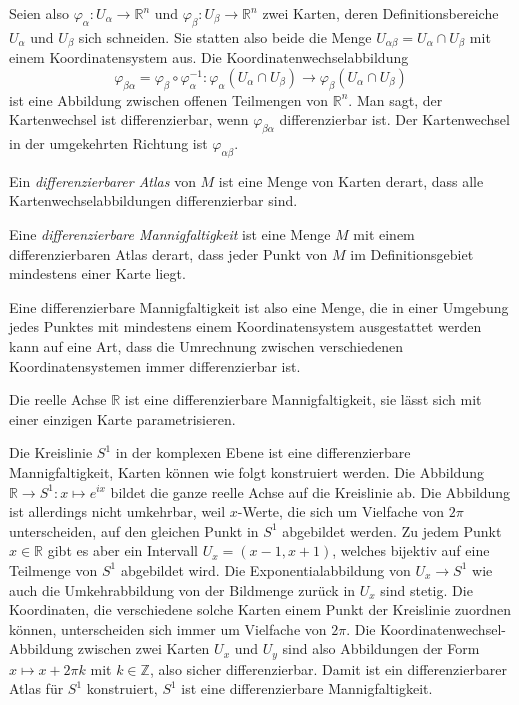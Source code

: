 Seien also
$\varphi_\alpha\colon U_\alpha \to \mathbb{R}^n$
und
$\varphi_\beta\colon U_\beta \to \mathbb{R}^n$
zwei Karten, deren Definitionsbereiche $U_\alpha$ und $U_\beta$ sich
schneiden.
Sie statten also beide die Menge $U_{\alpha\beta}=U_\alpha\cap U_\beta$
mit einem Koordinatensystem aus.
Die Koordinatenwechselabbildung
\[
\varphi_{\beta\alpha}
=
\varphi_\beta
\circ
\varphi_\alpha^{-1}
\colon
\varphi_\alpha(U_\alpha\cap U_\beta)
\to
\varphi_\beta(U_\alpha\cap U_\beta)
\]
ist eine Abbildung zwischen offenen Teilmengen von $\mathbb{R}^n$.
Man sagt, der Kartenwechsel ist differenzierbar, wenn $\varphi_{\beta\alpha}$
differenzierbar ist.
Der Kartenwechsel in der umgekehrten Richtung ist $\varphi_{\alpha\beta}$.

\begin{definition}
\label{buch:gruppen:gruppe:def:atlas}
Ein {\em differenzierbarer Atlas} von $M$ ist eine Menge von Karten derart,
dass alle Kartenwechselabbildungen differenzierbar sind.
\end{definition}

\begin{definition}
\label{buch:gruppen:gruppe:def:diffman}
Eine {\em differenzierbare Mannigfaltigkeit} ist eine Menge $M$ mit einem
differenzierbaren Atlas derart, dass jeder Punkt von $M$ im
Definitionsgebiet mindestens einer Karte liegt.
\end{definition}

Eine differenzierbare Mannigfaltigkeit ist also eine Menge, die in
einer Umgebung jedes Punktes mit mindestens einem Koordinatensystem
ausgestattet werden kann auf eine Art, dass die Umrechnung zwischen
verschiedenen Koordinatensystemen immer differenzierbar ist.

\begin{beispiel}
Die reelle Achse $\mathbb{R}$ ist eine differenzierbare Mannigfaltigkeit,
sie lässt sich mit einer einzigen Karte parametrisieren.
\end{beispiel}

\begin{beispiel}
Die Kreislinie $S^1$ in der komplexen Ebene ist eine differenzierbare
Mannigfaltigkeit, Karten können wie folgt konstruiert werden.
Die Abbildung $\mathbb{R}\to S^1: x\mapsto e^{ix}$ bildet die ganze
reelle Achse auf die Kreislinie ab.
Die Abbildung ist allerdings nicht umkehrbar, weil $x$-Werte, die sich
um Vielfache von $2\pi$ unterscheiden, auf den gleichen Punkt in $S^1$
abgebildet werden.
Zu jedem Punkt $x\in\mathbb{R}$ gibt es aber ein Intervall
$U_x=(x-1,x+1)$, welches bijektiv auf eine Teilmenge von $S^1$
abgebildet wird.
Die Exponentialabbildung von $U_x\to S^1$ wie auch die Umkehrabbildung
von der Bildmenge zurück in $U_x$ sind stetig.
Die Koordinaten, die verschiedene solche Karten einem Punkt der Kreislinie
zuordnen können, unterscheiden sich immer um Vielfache von $2\pi$.
Die Koordinatenwechsel-Abbildung zwischen zwei Karten $U_x$ und $U_y$
sind also Abbildungen der Form $x\mapsto x+2\pi k$ mit $k\in\mathbb{Z}$,
also sicher differenzierbar.
Damit ist ein differenzierbarer Atlas für $S^1$ konstruiert, $S^1$
ist eine differenzierbare Mannigfaltigkeit.
\end{beispiel}

